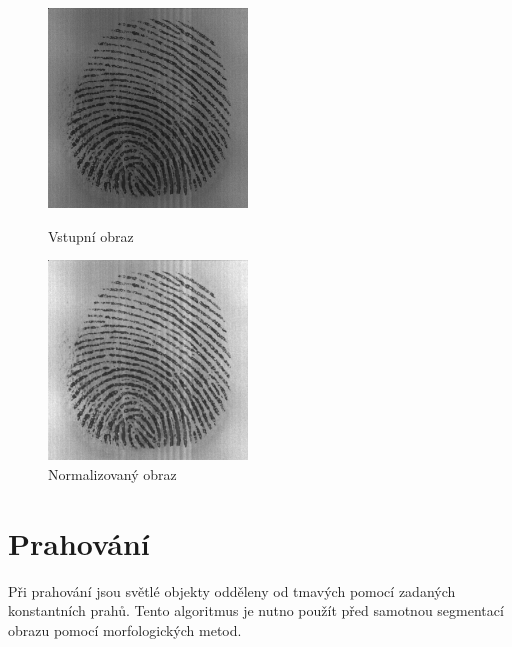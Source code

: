 \begin{figure}[htbp]
  \begin{minipage}[b]{0.5\linewidth}
    \centering
    \includegraphics[width=200]{obrazky-figures/102_1.png}
    \caption{Vstupní obraz}
    \label{fig:origimg}
  \end{minipage}
  \hspace{0.5cm}
  \begin{minipage}[b]{0.5\linewidth}
    \centering
    \includegraphics[width=200]{obrazky-figures/norm_img.png}
    \caption{Normalizovaný obraz}
    \label{fig:normimg}
  \end{minipage}
\end{figure}



\section{Prahování}
Při prahování jsou světlé objekty odděleny od tmavých pomocí zadaných konstantních prahů. Tento algoritmus je nutno použít před samotnou segmentací obrazu pomocí morfologických metod.

